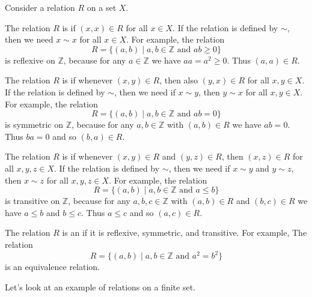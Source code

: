 \begin{defn}
\label{defn_equiv_rel}
    Consider a relation $R$ on a set $X$.
        \begin{apart}
            \item The relation $R$ is  if $(x,x) \in R$ for all $x \in X$.  If the relation is defined by $\sim$, then we need $x \sim x$ for all $x \in X$.  For example, the relation 
                $$R=\{ (a,b) \mid a, b\in \mathbb{Z} \text{ and } ab \ge 0\}$$
            is reflexive on $\mathbb{Z}$, because for any $a \in \mathbb{Z}$ we have $aa=a^2 \ge 0$. Thus $(a,a) \in R$.

            \item The relation $R$ is  if whenever $(x,y) \in R$, then also $(y,x)\in R$ for all $x,y \in X$. If the relation is defined by $\sim$, then we need if $x \sim y$, then $y \sim x$ for all $x,y \in X$.  For example, the relation 
                $$R=\{ (a,b) \mid a, b\in \mathbb{Z} \text{ and } ab = 0\}$$
            is symmetric on $\mathbb{Z}$, because for any $a,b \in \mathbb{Z}$ with $(a,b) \in R$ we have $ab=0$.  Thus $ba=0$ and so $(b,a) \in R$.

            \item The relation $R$ is  if whenever $(x,y) \in R$ and $(y,z) \in R$, then $(x,z)\in R$ for all $x,y,z \in X$. If the relation is defined by $\sim$, then we need if $x \sim y$ and $y \sim z$, then $x \sim z$ for all $x,y,z \in X$.  For example, the relation 
                $$R=\{ (a,b) \mid a, b\in \mathbb{Z} \text{ and } a \le b\}$$
            is transitive on $\mathbb{Z}$, because for any $a,b,c \in \mathbb{Z}$ with $(a,b) \in R$ and $(b,c) \in R$ we have $a \le b$ and $b \le c$. Thus $a \le c$ and so $(a,c) \in R$.

            \item The relation $R$ is an  if it is reflexive, symmetric, and transitive.  For example, The relation $$R=\{ (a,b) \mid a, b\in \mathbb{Z} \text{ and } a^2=b^2\}$$
            is an equivalence relation.
        \end{apart}
\end{defn}

Let's look at an example of relations on a finite set.

